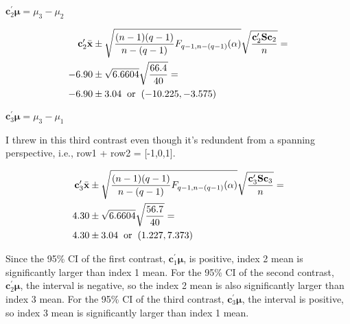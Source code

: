 \begin{enumerate}[label= (\alph*)]
    $\textbf{c}_{2}^{\prime}\bm{\mu} = \mu_{3} - \mu_{2}$

    \begin{align*}
        \textbf{c}_{2}^{\prime}\bar{\textbf{x}}
        & \pm
        \sqrt{ \frac{ (n-1)(q-1)}{n-(q-1) } F_{ q-1, n-(q-1) }(\alpha) }
        \sqrt{ \frac{\textbf{c}_{2}^{\prime}\textbf{S}\textbf{c}_{2}}{n} } = \\
        -6.90
        & \pm
        \sqrt{{ 6.6604 }}
        \sqrt{ \frac{66.4}{40} } = \\
        -6.90
        & \pm
        3.04 \hspace{0.2cm}\text{or}\hspace{0.2cm}(-10.225, -3.575)
    \end{align*}

    $\textbf{c}_{3}^{\prime}\bm{\mu} = \mu_{3} - \mu_{1}$

    I threw in this third contrast even though it's redundent from a spanning perspective, i.e., row1 + row2 = [-1,0,1].

    \begin{align*}
        \textbf{c}_{3}^{\prime}\bar{\textbf{x}}
        & \pm
        \sqrt{ \frac{ (n-1)(q-1)}{n-(q-1) } F_{ q-1, n-(q-1) }(\alpha) }
        \sqrt{ \frac{\textbf{c}_{3}^{\prime}\textbf{S}\textbf{c}_{3}}{n} } = \\
        4.30
        & \pm
        \sqrt{{ 6.6604 }}
        \sqrt{ \frac{56.7}{40} } = \\
        4.30
        & \pm
        3.04 \hspace{0.2cm}\text{or}\hspace{0.2cm}(1.227, 7.373)
    \end{align*}


    Since the 95\% CI of the first contrast, $\textbf{c}_{1}^{\prime}\bm{\mu}$, is positive, index 2 mean is significantly larger than index 1 mean.
    For the 95\% CI of the second contrast, $\textbf{c}_{2}^{\prime}\bm{\mu}$, the interval is negative, so the index 2 mean is also significantly larger than index 3 mean.
    For the 95\% CI of the third contrast, $\textbf{c}_{3}^{\prime}\bm{\mu}$, the interval is positive, so index 3 mean is significantly larger than index 1 mean.

\end{enumerate}